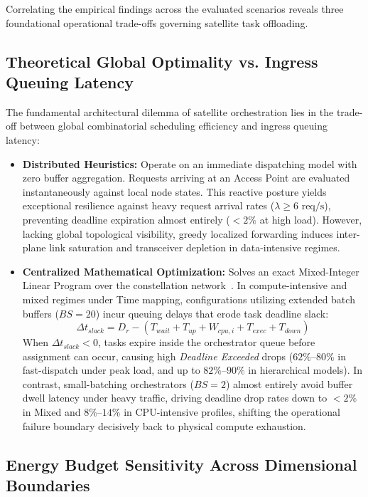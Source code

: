 Correlating the empirical findings across the evaluated scenarios reveals three foundational operational trade-offs governing satellite task offloading.

\subsection{Theoretical Global Optimality vs. Ingress Queuing Latency}
\label{subsec:tradeoff_optimality_queuing}

The fundamental architectural dilemma of satellite orchestration lies in the trade-off between global combinatorial scheduling efficiency and ingress queuing latency:
\begin{itemize}
    \item \textbf{Distributed Heuristics:} Operate on an immediate dispatching model with zero buffer aggregation. Requests arriving at an Access Point are evaluated instantaneously against local node states. This reactive posture yields exceptional resilience against heavy request arrival rates ($\lambda \ge 6\text{ req/s}$), preventing deadline expiration almost entirely ($<2\%$ at high load). However, lacking global topological visibility, greedy localized forwarding induces inter-plane link saturation and transceiver depletion in data-intensive regimes.
    \item \textbf{Centralized Mathematical Optimization:} Solves an exact Mixed-Integer Linear Program over the constellation network~\cite{wolsey1998integer, boyd2004convex}. In compute-intensive and mixed regimes under Time mapping, configurations utilizing extended batch buffers ($BS = 20$) incur queuing delays that erode task deadline slack:
    \begin{equation}
        \Delta t_{slack} = D_r - (T_{wait} + T_{up} + W_{cpu,i} + T_{exec} + T_{down})
    \end{equation}
    When $\Delta t_{slack} < 0$, tasks expire inside the orchestrator queue before assignment can occur, causing high \textit{Deadline Exceeded} drops ($62\%\text{--}80\%$ in fast-dispatch under peak load, and up to $82\%\text{--}90\%$ in hierarchical models). In contrast, small-batching orchestrators ($BS = 2$) almost entirely avoid buffer dwell latency under heavy traffic, driving deadline drop rates down to $<2\%$ in Mixed and $8\%\text{--}14\%$ in CPU-intensive profiles, shifting the operational failure boundary decisively back to physical compute exhaustion.
\end{itemize}

\subsection{Energy Budget Sensitivity Across Dimensional Boundaries}
\label{subsec:tradeoff_energy_sensitivity}

